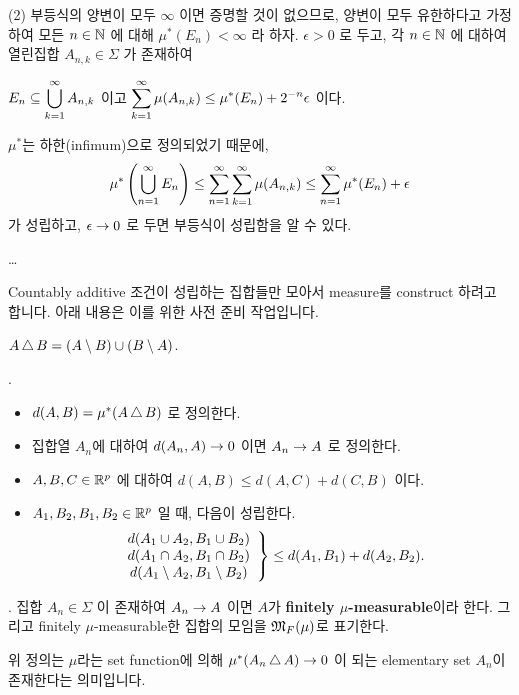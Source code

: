 (2) 부등식의 양변이 모두 \(\infty\) 이면 증명할 것이 없으므로, 양변이 모두 유한하다고 가정하여 모든 \(n\in \mathbb{N}\) 에 대해 \(\mu^\ast(E_n) < \infty\) 라 하자. \(\epsilon > 0\) 로 두고, 각 \(n \in \mathbb{N}\) 에 대하여 열린집합 \(A_{n, k} \in \Sigma\) 가 존재하여
\begin{center}
    \(E_n \subseteq \displaystyle \bigcup_{k=1}^\infty A_{n, k}\) 이고 \(\displaystyle \sum_{k=1}^\infty \mu(A_{n,k}) \leq \mu^\ast(E_n) + 2^{-n}\epsilon\) 이다.
\end{center}
\(\mu^\ast\)는 하한(infimum)으로 정의되었기 때문에,
\[
    \mu^\ast\left( \bigcup_{n=1}^\infty E_n \right) \leq \sum_{n=1}^\infty \sum_{k=1}^\infty \mu(A_{n,k}) \leq \sum_{n=1}^\infty \mu^\ast(E_n) + \epsilon
\]
가 성립하고, \(\epsilon \rightarrow 0\) 로 두면 부등식이 성립함을 알 수 있다.

\dots

Countably additive 조건이 성립하는 집합들만 모아서 measure를 construct 하려고 합니다. 아래 내용은 이를 위한 사전 준비 작업입니다.

\notation {} \(A \operatorname{\triangle} B = (A\setminus B) \cup (B \setminus A)\).

.
\begin{itemize}
    \item \(d(A, B) = \mu^\ast(A \operatorname{\triangle} B)\) 로 정의한다.
    \item 집합열 \(A_n\)에 대하여 \(d(A_n, A) \rightarrow 0\) 이면 \(A_n \rightarrow A\) 로 정의한다.
\end{itemize}

\rmk
\begin{itemize}
    \item \(A, B, C \in \mathbb{R}^p\) 에 대하여 \(d(A, B) \leq d(A, C) + d(C, B)\) 이다.
    \item \(A_1, B_2, B_1, B_2 \in \mathbb{R}^p\) 일 때, 다음이 성립한다.
          \[
              \left.\begin{array}{c}d(A_1 \cup A_2, B_1 \cup B_2) \\d(A_1 \cap A_2, B_1 \cap B_2) \\d(A_1 \setminus A_2, B_1 \setminus B_2)\end{array}\right\}
              \leq d(A_1, B_1) + d(A_2, B_2).
          \]
\end{itemize}

.  집합 \(A_n \in \Sigma\) 이 존재하여 \(A_n \rightarrow A\) 이면 \(A\)가 \textbf{finitely \(\mu\)-measurable}이라 한다. 그리고 finitely \(\mu\)-measurable한 집합의 모임을 \(\mathfrak{M}_F(\mu)\)로 표기한다.

위 정의는 \(\mu\)라는 set function에 의해 \(\mu^\ast (A_n \operatorname{\triangle} A) \rightarrow 0\) 이 되는 elementary set \(A_n\)이 존재한다는 의미입니다.

